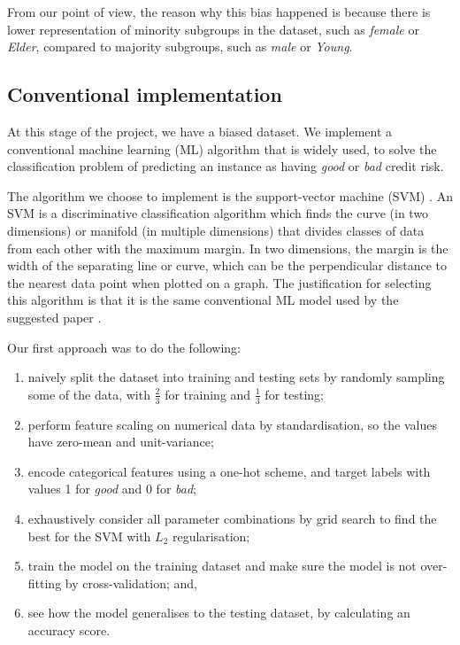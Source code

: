 \documentclass[conference]{IEEEtran}
\begin{document}
From our point of view, the reason why this bias happened is because there is lower representation of minority subgroups in the dataset, such as \emph{female} or \emph{Elder}, compared to majority subgroups, such as \emph{male} or \emph{Young}.

\subsection{Conventional implementation}
At this stage of the project, we have a biased dataset. We implement a conventional machine learning (ML) algorithm that is widely used, to solve the classification problem of predicting an instance as having \emph{good} or \emph{bad} credit risk.

The algorithm we choose to implement is the support-vector machine (SVM) \cite{Cortes1995}. An SVM is a discriminative classification algorithm which finds the curve (in two dimensions) or manifold (in multiple dimensions) that divides classes of data from each other with the maximum margin. In two dimensions, the margin is the width of the separating line or curve, which can be the perpendicular distance to the nearest data point when plotted on a graph. The justification for selecting this algorithm is that it is the same conventional ML model used by the suggested paper \cite{Feldman2015ComputationalFP}.

Our first approach was to do the following:
\begin{enumerate}
    \item naively split the dataset into training and testing sets by randomly sampling some of the data, with $\frac{2}{3}$ for training and $\frac{1}{3}$ for testing;
    \item perform feature scaling on numerical data by standardisation, so the values have zero-mean and unit-variance;
    \item encode categorical features using a one-hot scheme, and target labels with values 1 for \emph{good} and 0 for \emph{bad};
    \item exhaustively consider all parameter combinations by grid search to find the best for the SVM with $L_2$ regularisation;
    \item train the model on the training dataset and make sure the model is not over-fitting by cross-validation; and,
    \item see how the model generalises to the testing dataset, by calculating an accuracy score. 
\end{enumerate}
\end{document}
